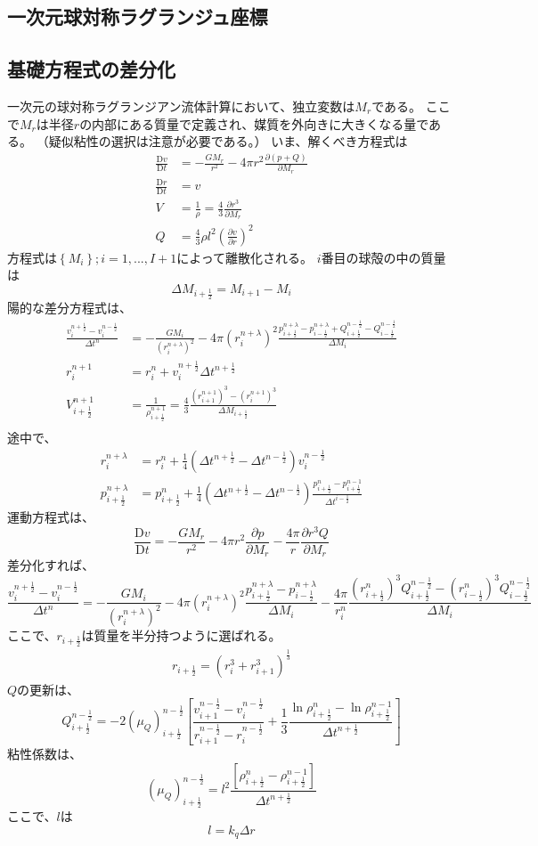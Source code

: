 \documentclass{jsarticle}
\newcommand{\pder}[2][]{\frac{\partial#1}{\partial#2}}
\newcommand{\Dder}[2][]{\frac{\mathrm{D}#1}{\mathrm{D}#2}}
\newcommand{\half}{\frac{1}{2}}
\newcommand{\hpn}{n + \half}
\newcommand{\hmn}{n - \half}
\newcommand{\hpi}{i + \half}
\newcommand{\hmi}{i - \half}
\newcommand{\beq}{\begin{equation}}
\newcommand{\eeq}{\end{equation}}
\begin{document}
\subsection{一次元球対称ラグランジュ座標}
\subsection{基礎方程式の差分化}
一次元の球対称ラグランジアン流体計算において、独立変数は$M_r$である。
ここで$M_r$は半径$r$の内部にある質量で定義され、媒質を外向きに大きくなる量である。
（疑似粘性の選択は注意が必要である。）
いま、解くべき方程式は
\begin{align}
    \Dder[v]{t} &= - \frac{GM_r}{r^2} - 4\pi r^2\pder[(p + Q)]{M_r}\\
    \Dder[r]{t} &= v\\
    V &= \frac{1}{\rho}=\frac{4}{3}\pder[r^3]{M_r}\\
    Q &= \frac{4}{3}\rho l^2 (\pder[v]{r})^2\label{eq:q}
\end{align}
方程式は$\left\{M_i\right\};i = 1,...,I+1$によって離散化される。
$i$番目の球殻の中の質量は
\beq
    \Delta M_{i+\half} = M_{i+1} - M_i
\eeq
陽的な差分方程式は、
\begin{align}
    \frac{v^{n+\half}_i - v^{n-\half}_i}{\Delta t^n} &= -\frac{GM_i}{(r^{n+\lambda}_i)^2}
    -4\pi(r^{n+\lambda}_i)^2
    \frac{p^{n+\lambda}_{i+\half} - p^{n+\lambda}_{i-\half}+Q^{n-\half}_{i+\half} - Q^{n-\half}_{i-\half}}{\Delta M_i}\\
    r^{n+1}_i &= r^{n}_i + v^{\hpn}_i \Delta t^{\hpn}\\
    V^{n+1}_{\hpi} &= \frac{1}{\rho^{n+1}_{\hpi}}=\frac{4}{3}\frac{(r^{n+1}_{i+1})^3 - (r^{n+1}_{i})^3}{\Delta M_{\hpi}}\\
\end{align}
途中で、
\begin{align}
    r^{n+\lambda}_i &= r^n_i + \frac{1}{4} (\Delta t^{n+\half} - \Delta t^{n-\half})v^{n-\half}_i\\
    p^{n+\lambda}_{\hpi} &=  p^{n}_{\hpi} + \frac{1}{4} (\Delta t^{n+\half} - \Delta t^{n-\half})
    \frac{p^{n}_{\hpi} - p^{n-1}_{\hpi}}{\Delta t^{\hmi}}
\end{align}
運動方程式は、
\beq
    \Dder[v]{t} = - \frac{GM_r}{r^2} - 4\pi r^2\pder[p]{M_r} - \frac{4\pi}{r}\pder[r^3Q]{M_r}
\eeq
差分化すれば、
\beq
    \frac{v^{n+\half}_i - v^{n-\half}_i}{\Delta t^n} =
    -\frac{GM_i}{(r^{n+\lambda}_i)^2}
    -4\pi(r^{n+\lambda}_i)^2
    \frac{p^{n+\lambda}_{i+\half} - p^{n+\lambda}_{i-\half}}{\Delta M_i}
    -\frac{4\pi}{r^{n}_i}
    \frac{(r^{n}_{i+\half})^3Q^{n-\half}_{i+\half} - (r^{n}_{i-\half})^3Q^{n-\half}_{i-\half}}{\Delta M_i}
\eeq
ここで、$r_{i+\half}$は質量を半分持つように選ばれる。
\begin{align}
    r_{i+\half} = (r^3_i + r^3_{i+1})^{\frac{1}{3}}
\end{align}
$Q$の更新は、
\beq
    Q^{\hmn}_{\hpi} = - 2 (\mu_Q)^{\hmn}_{\hpi}
     \left[\frac{v^{\hmn}_{i+1}-v^{\hmn}_{i}}{r^{\hmn}_{i+1}-r^{\hmn}_{i}}
      +\frac{1}{3}\frac{\ln \rho^{n}_{\hpi} - \ln \rho^{n-1}_{\hpi}}{\Delta t^{\hpn}}\right]
\eeq
粘性係数は、
\beq
    (\mu_Q)^{n-\half}_{i+\half} = 
    l^2 \frac{\left[ \rho^n_{\hpi} - \rho^{n-1}_{\hpi}\right]}{\Delta t^{\hpn}}
\eeq
ここで、$l$は
\beq
    l = k_q \Delta r
\eeq
\end{document}
